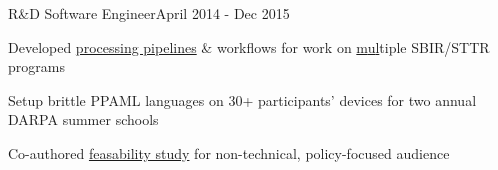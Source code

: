 \documentclass{article}
\newenvironment{**mylist}[2]{

\subsubsection*{#1\hfill#2}
  \small
  \begin{list}{}{}
    \setlength{\topsep}{.2pt}
   \setlength{\itemsep}{.8pt}
   \setlength{\parskip}{0pt}
   \setlength{\parsep}{0pt}}{\end{list}\normalsize}
\def\PT{{\bf(Part Time)}\xspace}
\begin{document}
\begin{comment}
\begin{((mylist}{\href{http://pdxcodeguild.com/}{\bf{PDXCodeGuild}} \PT \tabb {\bf{June 2016}}}
\item Developed \& taught introductory \href{https://github.com/probinso/Intro-to-Python}{python course} material for coding boot-camp
\item \hspace{-1em}
\end{**mylist}
\end{comment}

\begin{**mylist}{ \tabb R\&D Software Engineer}{April 2014 - Dec 2015}
\item Developed \href{https://github.com/probinso/ppaml-eval-tools}{processing pipelines} \& workflows for  work on \href{https://www.darpa.mil/research/programs/probabilistic-programming-for-advancing-machine-Learning}{m}\href{https://galois.com/news/galois-awarded-10m-darpa-contract-make-legacy-systems-secure/}{u}\href{https://www.darpa.mil/program/safeware}{l}tiple SBIR/STTR programs
\item Setup brittle PPAML languages on 30+ participants’ devices for two annual DARPA summer schools
\item
  Co-authored  \href{https://usvotefoundation-drupal.s3.amazonaws.com/prod/E2EVIV_nontechnical_audience_report.pdf}{feasability study} for non-technical, policy-focused audience

\end{**mylist}
\end{document}
